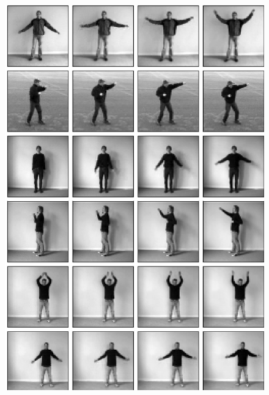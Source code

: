 \documentclass[12pt]{article}
\begin{document}
	\begin{figure}
		\begin{minipage}[position=l]{0.5\textwidth}
			\begin{mdframed}[style=inner]
				\includegraphics[scale=0.47]{movies_input}
			\end{mdframed}
		\end{minipage}
		\begin{minipage}[position=r]{0.5\textwidth}
			\begin{mdframed}[style=inner]

\end{mdframed}
\end{minipage}
\end{figure}
\end{document}
